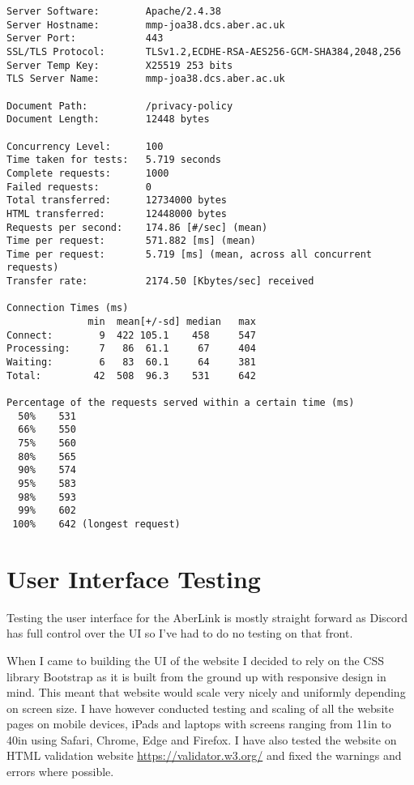 \begin{verbatim}
Server Software:        Apache/2.4.38
Server Hostname:        mmp-joa38.dcs.aber.ac.uk
Server Port:            443
SSL/TLS Protocol:       TLSv1.2,ECDHE-RSA-AES256-GCM-SHA384,2048,256
Server Temp Key:        X25519 253 bits
TLS Server Name:        mmp-joa38.dcs.aber.ac.uk

Document Path:          /privacy-policy
Document Length:        12448 bytes

Concurrency Level:      100
Time taken for tests:   5.719 seconds
Complete requests:      1000
Failed requests:        0
Total transferred:      12734000 bytes
HTML transferred:       12448000 bytes
Requests per second:    174.86 [#/sec] (mean)
Time per request:       571.882 [ms] (mean)
Time per request:       5.719 [ms] (mean, across all concurrent requests)
Transfer rate:          2174.50 [Kbytes/sec] received

Connection Times (ms)
              min  mean[+/-sd] median   max
Connect:        9  422 105.1    458     547
Processing:     7   86  61.1     67     404
Waiting:        6   83  60.1     64     381
Total:         42  508  96.3    531     642

Percentage of the requests served within a certain time (ms)
  50%    531
  66%    550
  75%    560
  80%    565
  90%    574
  95%    583
  98%    593
  99%    602
 100%    642 (longest request)
\end{verbatim}

\section{User Interface Testing}
Testing the user interface for the AberLink is mostly straight forward as Discord has full control over the UI so I've had to do no testing on that front.

When I came to building the UI of the website I decided to rely on the CSS library Bootstrap \cite{bootstrap} as it is built from the ground up with responsive design in mind. This meant that website would scale very nicely and uniformly depending on screen size. I have however conducted testing and scaling of all the website pages on mobile devices, iPads and laptops with screens ranging from 11in to 40in using Safari, Chrome, Edge and Firefox. I have also tested the website on HTML validation website \href{https://validator.w3.org/}{https://validator.w3.org/} and fixed the warnings and errors where possible.


